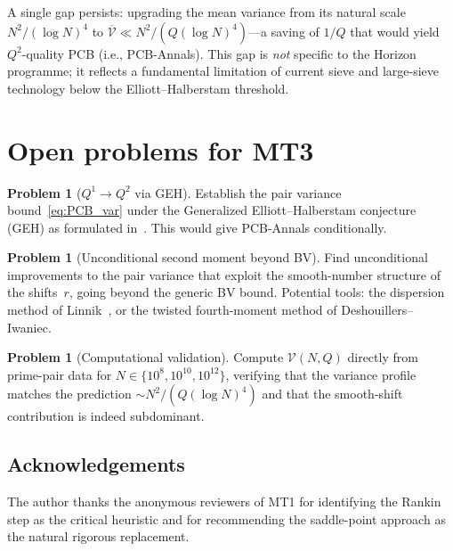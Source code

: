 \documentclass[11pt,reqno]{amsart}
\theoremstyle{plain}
\theoremstyle{definition}
\newtheorem{problem}[theorem]{Problem}
\theoremstyle{remark}
\begin{document}
A single gap persists: upgrading the mean variance from its
natural scale $N^2/(\log N)^4$ to
$\overline{\mathcal{V}} \ll N^2/(Q(\log N)^4)$---a saving of $1/Q$
that would yield $Q^2$-quality PCB (i.e., PCB-Annals).
This gap is \emph{not} specific to the Horizon programme; it reflects
a fundamental limitation of current sieve and large-sieve technology
below the Elliott--Halberstam threshold.

\section{Open problems for MT3}\label{sec:MT3}

\begin{problem}[$Q^1 \to Q^2$ via GEH]\label{prob:GEH}
Establish the pair variance bound~\eqref{eq:PCB_var} under the
Generalized Elliott--Halberstam conjecture (GEH) as formulated
in~\cite{Polymath2014}. This would give PCB-Annals conditionally.
\end{problem}

\begin{problem}[Unconditional second moment beyond BV]\label{prob:BV+}
Find unconditional improvements to the pair variance that exploit
the smooth-number structure of the shifts~$r$, going beyond the
generic BV bound. Potential tools: the dispersion method of
Linnik~\cite{BFI1986}, or the twisted fourth-moment method
of Deshouillers--Iwaniec.
\end{problem}

\begin{problem}[Computational validation]\label{prob:T4}
Compute $\mathcal{V}(N,Q)$ directly from prime-pair data for
$N \in \{10^8, 10^{10}, 10^{12}\}$, verifying that the
variance profile matches the prediction $\sim N^2/(Q(\log N)^4)$
and that the smooth-shift contribution is indeed subdominant.
\end{problem}


\subsection*{Acknowledgements}

The author thanks the anonymous reviewers of MT1 for identifying the
Rankin step as the critical heuristic and for recommending the
saddle-point approach as the natural rigorous replacement.
\end{document}

